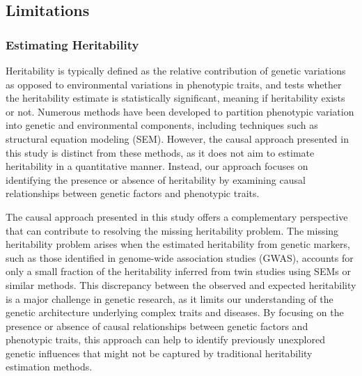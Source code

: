 
\subsection{Limitations} \label{discussion:limitations}
\subsubsection{Estimating Heritability}
Heritability is typically defined as the relative contribution of genetic variations as opposed to environmental variations in phenotypic traits, and tests whether the heritability estimate is statistically significant, meaning if heritability exists or not. Numerous methods have been developed to partition phenotypic variation into genetic and environmental components, including techniques such as structural equation modeling (SEM). However, the causal approach presented in this study is distinct from these methods, as it does not aim to estimate heritability in a quantitative manner. Instead, our approach focuses on identifying the presence or absence of heritability by examining causal relationships between genetic factors and phenotypic traits.

The causal approach presented in this study offers a complementary perspective that can contribute to resolving the missing heritability problem. The missing heritability problem arises when the estimated heritability from genetic markers, such as those identified in genome-wide association studies (GWAS), accounts for only a small fraction of the heritability inferred from twin studies using SEMs or similar methods. This discrepancy between the observed and expected heritability is a major challenge in genetic research, as it limits our understanding of the genetic architecture underlying complex traits and diseases. By focusing on the presence or absence of causal relationships between genetic factors and phenotypic traits, this approach can help to identify previously unexplored genetic influences that might not be captured by traditional heritability estimation methods.

